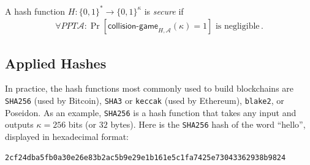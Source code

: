 \begin{definition}
  A hash function $H: \{0, 1\}^* \longrightarrow \{0, 1\}^\kappa$ is \emph{secure} if
  \begin{gather*}
    \forall PPT \mathcal{A}:
    \Pr[\textsf{collision-game}_{H,\mathcal{A}}(\kappa) = 1] \text{ is negligible}\,.
  \end{gather*}
\end{definition}

\subsection*{Applied Hashes}

In practice, the hash functions most commonly used to build blockchains are
\texttt{SHA256} (used by Bitcoin), \texttt{SHA3} or \texttt{keccak} (used by Ethereum),
\texttt{blake2}, or Poseidon. As an example, \texttt{SHA256} is a hash function that takes
any input and outputs $\kappa = 256$ bits (or $32$ bytes). Here is the \texttt{SHA256} hash
of the word ``hello'', displayed in hexadecimal format:

\texttt{2cf24dba5fb0a30e26e83b2ac5b9e29e1b161e5c1fa7425e73043362938b9824}

%
%
%
